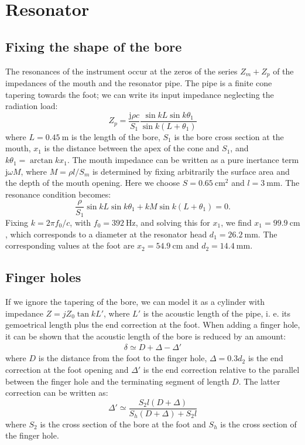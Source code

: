 \documentclass[a4paper]{article}
\begin{document}
\section{Resonator}
\subsection{Fixing the shape of the bore}
The resonances of the instrument occur at the zeros of the series $Z_m + Z_p$ of the impedances of the mouth and the resonator pipe. The pipe is a finite cone tapering towards the foot; we can write its input impedance neglecting the radiation load:
$$ Z_p = \frac{\mathrm{j} \rho c }{S_1} \frac{\sin kL \sin k\theta_1}{\sin k(L+\theta_1)} $$
where $L = 0.45~\si{\meter}$ is the length of the bore, $S_1$ is the bore cross section at the mouth, $x_1$ is the distance between the apex of the cone and $S_1$, and $k\theta_1 = \arctan kx_1 $.
The mouth impedance can be written as a pure inertance term $\mathrm{j} \omega M$, where $M = \rho l / S_m$ is determined by fixing arbitrarily the surface area and the depth of the mouth opening. Here we choose $S = 0.65~\si{\centi\meter\squared}$ and $l = 3~\si{\milli\meter}$. 
The resonance condition becomes:
$$ \frac{\rho}{S_1} \sin kL \sin k\theta_1 + kM\sin k(L+\theta_1) = 0 .$$ 
Fixing $k = 2\pi f_0 /c$, with $f_0 = 392~\si{\hertz}$, and solving this for $x_1$, we find $x_1 = 99.9~\si{\centi\meter}$, which corresponds to a diameter at the resonator head $d_1 = 26.2~\si{\milli\meter}$. The corresponding values at the foot are $x_2 = 54.9~\si{\centi\meter}$ and $d_2 = 14.4~\si{\milli\meter}$.

\subsection{Finger holes}
If we ignore the tapering of the bore, we can model it as a cylinder with impedance $Z = jZ_0\tan kL'$, where $L'$ is the acoustic length of the pipe, i. e. its gemoetrical length plus the end correction at the foot.
When adding a finger hole, it can be shown that the acoustic length of the bore is reduced by an amount:
\begin{align*}
	\delta \simeq D + \Delta - \Delta' 
\end{align*}
where $D$ is the distance from the foot to the finger hole, $\Delta = 0.3d_2$ is the end correction at the foot opening and $\Delta'$ is the end correction relative to the parallel between the finger hole and the terminating segment of length $D$. The latter correction can be written as:
$$ \Delta' \simeq \frac{S_2 l(D+\Delta)}{S_h(D+\Delta) + S_2 l} $$
where $S_2$ is the cross section of the bore at the foot and $S_h$ is the cross section of the finger hole.
\end{document}
